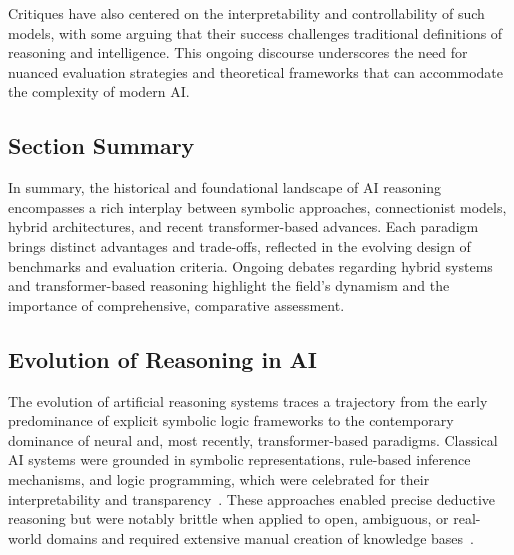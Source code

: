\documentclass[sigconf]{acmart}
\begin{document}
Critiques have also centered on the interpretability and controllability of such models, with some arguing that their success challenges traditional definitions of reasoning and intelligence. This ongoing discourse underscores the need for nuanced evaluation strategies and theoretical frameworks that can accommodate the complexity of modern AI.

\subsection{Section Summary}
In summary, the historical and foundational landscape of AI reasoning encompasses a rich interplay between symbolic approaches, connectionist models, hybrid architectures, and recent transformer-based advances. Each paradigm brings distinct advantages and trade-offs, reflected in the evolving design of benchmarks and evaluation criteria. Ongoing debates regarding hybrid systems and transformer-based reasoning highlight the field's dynamism and the importance of comprehensive, comparative assessment.

\subsection{Evolution of Reasoning in AI}

The evolution of artificial reasoning systems traces a trajectory from the early predominance of explicit symbolic logic frameworks to the contemporary dominance of neural and, most recently, transformer-based paradigms. Classical AI systems were grounded in symbolic representations, rule-based inference mechanisms, and logic programming, which were celebrated for their interpretability and transparency~\cite{ref42,ref49,ref54,ref86}. These approaches enabled precise deductive reasoning but were notably brittle when applied to open, ambiguous, or real-world domains and required extensive manual creation of knowledge bases~\cite{ref86}.
\end{document}
